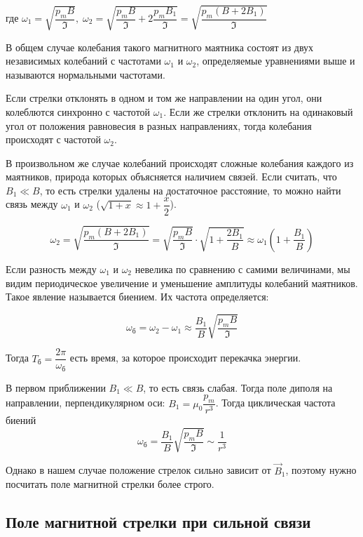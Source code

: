 \documentclass{letask}
\begin{document}
где $\omega_1 = \sqrt{\dfrac{p_m B}{\mathfrak{I}}}, \; \omega_2 = \sqrt{\dfrac{p_m B}{\mathfrak{I}} + 2\dfrac{p_m B_1}{\mathfrak{I}}} = \sqrt{\dfrac{p_m(B+2B_1)}{\mathfrak{I}}}$

В общем случае колебания такого магнитного маятника состоят из двух независимых колебаний с частотами $\omega_1$ и $\omega_2$, определяемые уравнениями выше и называются нормальными частотами. 

Если стрелки отклонять в одном и том же направлении на один угол, они колеблются синхронно с частотой $\omega_1$. Если же стрелки отклонить на одинаковый угол от положения равновесия в разных направлениях, тогда колебания происходят с частотой $\omega_2$.

В произвольном же случае колебаний происходят сложные колебания каждого из маятников, природа которых объясняется наличием связей.
Если считать, что $B_1 \ll B$, то есть стрелки удалены на достаточное расстояние, то можно найти связь между $\omega_1$ и $\omega_2$ ($\sqrt{1+x} \approx 1 + \dfrac{x}{2}$).

\begin{equation}
\omega_2 = \sqrt{\dfrac{p_m(B+2B_1)}{\mathfrak{I}}} = \sqrt{\dfrac{p_m B}{\mathfrak{I}}} \cdot \sqrt{1+\dfrac{2B_1}{B}} \approx \omega_1(1+\dfrac{B_1}{B})
\end{equation}

Если разность между $\omega_1$ и $\omega_2$ невелика по сравнению с самими величинами, мы видим периодическое увеличение и уменьшение амплитуды колебаний маятников. Такое явление называется биением. Их частота определяется:

\begin{equation}
\omega_{\text{б}} = \omega_2 - \omega_1 \approx \dfrac{B_1}{B} \sqrt{\dfrac{p_m B}{\mathfrak{I}}}
\end{equation}

Тогда $T_\text{б} = \dfrac{2\pi}{\omega_\text{б}}$ есть время, за которое происходит перекачка энергии.

В первом приближении $B_1 \ll B$, то есть связь слабая. Тогда поле диполя на направлении, перпендикулярном оси: $B_1 = \mu_0 \dfrac{p_m}{r^3}$.  Тогда циклическая частота биений $$\omega_\text{б} = \dfrac{B_1}{B} \sqrt{\dfrac{p_m B}{\mathfrak{I}}} \sim \dfrac{1}{r^3}$$

Однако в нашем случае положение стрелок сильно зависит от $\vec B_1$, поэтому нужно посчитать поле магнитной стрелки более строго.

\subsection{Поле магнитной стрелки при сильной связи}
\end{document}
